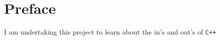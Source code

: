 \documentclass[main.tex]{subfiles}
\begin{document}
\chapter*{Preface}

I am undertaking this project to learn about the in's and out's of \verb|C++|
\end{document}
